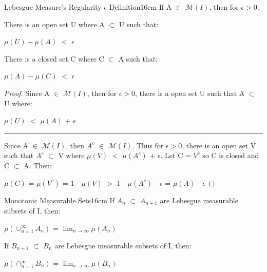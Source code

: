     \newpage



    \begin{wtheorem}{Lebesgue Measure's Regularity $\epsilon$ Definition}{16cm}
        If A $\in$ $\mathcal{M}(I)$, then for $\epsilon > 0$:

        \hspace{0.5cm}
        There is an open set U where A $\subset$ U such that:

        \hspace{1cm}
        $\mu(U) - \mu(A)$ $<$ $\epsilon$
        
        \hspace{0.5cm}
        There is a closed set C where C $\subset$ A such that:

        \hspace{1cm}
        $\mu(A) - \mu(C)$ $<$ $\epsilon$
    \end{wtheorem}

    \begin{proof}
        Since A $\in$ $\mathcal{M}(I)$, then for $\epsilon > 0$,
        there is a open set U such that A $\subset$ U where:

        \hspace{0.5cm}
        $\mu(U)$ $<$ $\mu(A)$ + $\epsilon$

        \rule[0.1cm]{16.7cm}{0.01cm}

        Since A $\in$ $\mathcal{M}(I)$, then $A^c$ $\in$ $\mathcal{M}(I)$.
        Thus for $\epsilon > 0$, there is an open set V such that
        $A^c$ $\subset$ V where $\mu(V)$ $<$ $\mu(A^c)$ + $\epsilon$.
        Let C = $V^c$ so C is closed and C $\subset$ A. Then:

        \hspace{0.5cm}
        $\mu(C)$
        = $\mu(V^c)$
        = 1 - $\mu(V)$
        $>$ 1 - $\mu(A^c)$ - $\epsilon$
        = $\mu(A)$ - $\epsilon$
    \end{proof}

    \vspace{0.5cm}



    \begin{wtheorem}{Monotonic Measurable Sets}{16cm}
        If $A_n$ $\subset$ $A_{n+1}$ are Lebesgue measurable subsets of I, then:

        \hspace{0.5cm}
        $\mu(\cup_{n=1}^{\infty} A_n)$
        = $\lim_{n \rightarrow \infty} \mu(A_n)$

        If $B_{n+1}$ $\subset$ $B_n$ are Lebesgue measurable subsets of I, then:

        \hspace{0.5cm}
        $\mu(\cap_{n=1}^{\infty} B_n)$
        = $\lim_{n \rightarrow \infty} \mu(B_n)$
    \end{wtheorem}

